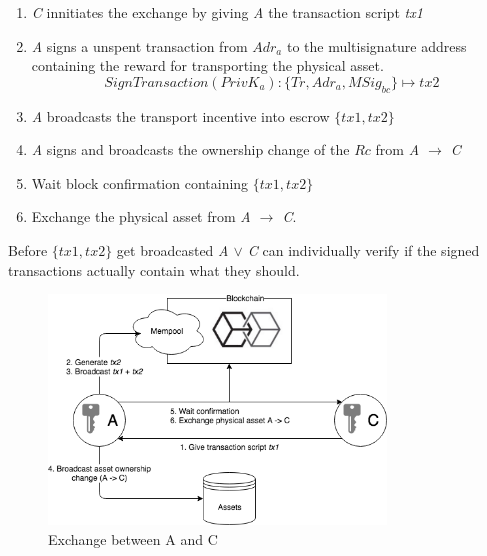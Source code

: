 \begin{enumerate}
  \item \textit{C} innitiates the exchange by giving \textit{A} the transaction script \textit{tx1}
  \item \textit{A} signs a unspent transaction from $Adr_a$ to the multisignature address containing the reward for transporting the physical asset. \[SignTransaction(PrivK_a)\colon\{Tr, Adr_a, MSig_{bc}\}\mapsto tx2\]
  \item \textit{A} broadcasts the transport incentive into escrow $\{tx1, tx2\}$
  \item \textit{A} signs and broadcasts the ownership change of the $Rc$ from \textit{A $\rightarrow$ C}
  \item Wait block confirmation containing $\{tx1, tx2\}$
  \item Exchange the physical asset from \textit{A $\rightarrow$ C}.
\end{enumerate}

Before $\{tx1, tx2\}$ get broadcasted \textit{A $\lor$ C} can individually verify if the signed transactions actually contain what they should.

\begin{figure}[h]
\centering
\includegraphics[width=0.8\textwidth]{images/exchange_01.png}
\caption{Exchange between A and C}
\label{fig:2 first exchange}
\end{figure}

